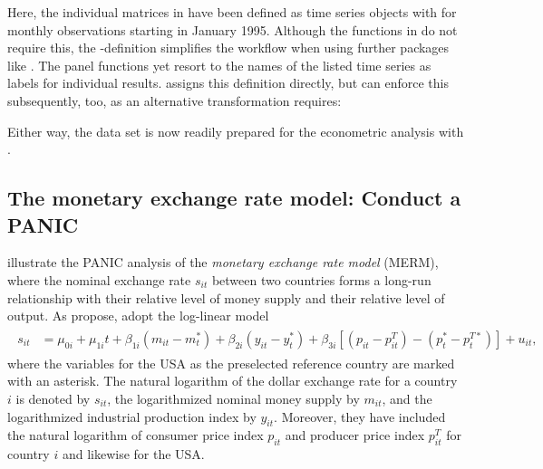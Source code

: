 Here, the individual matrices in  have been defined as time series objects  with  for monthly observations starting in January 1995. Although the functions in  do not require this, the -definition simplifies the workflow when using further packages like  \citep{Wickham2016}. The panel functions yet resort to the names of the listed time series as labels for individual results.  assigns this definition directly, but  can enforce this subsequently, too, as an alternative transformation requires:
\begin{CodeChunk}
\end{CodeChunk}
Either way, the data set is now readily prepared for the econometric analysis with .


\subsection{The monetary exchange rate model: Conduct a PANIC} \label{sec:MERM}
\citet{OersalArsova2017} illustrate the PANIC analysis of the \textit{monetary exchange rate model} (MERM), where the nominal exchange rate $ s_{it} $ between two countries forms a long-run relationship with their relative level of money supply and their relative level of output. As \citet{Dabrowski2014} propose, \citeauthor{OersalArsova2017} adopt the log-linear model 
\begin{align} \label{eq:MERM}
\begin{split}
	s_{it} & = \mu_{0i} + \mu_{1i} t + \beta_{1i} \left( m_{it} - m^*_{t} \right) + \beta_{2i} \left( y_{it} - y^*_{t} \right) + \beta_{3i} \left[ \left( p_{it} - p^T_{it} \right) - \left( p^*_{t} - p^{T*}_{t} \right) \right] + u_{it},
\end{split}
\end{align}
where the variables for the USA as the preselected reference country are marked with an asterisk. The natural logarithm of the dollar exchange rate for a country $ i $ is denoted by $ s_{it} $, the logarithmized nominal money supply by $  m_{it} $, and the logarithmized industrial production index by $  y_{it} $. Moreover, they have included the natural logarithm of consumer price index $ p_{it} $ and producer price index $ p^T_{it} $ for country $ i $ and likewise for the USA. 


